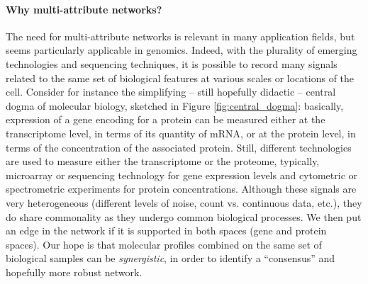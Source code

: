 \paragraph*{Why    multi-attribute    networks?}    The    need    for
multi-attribute networks  is relevant in many  application fields, but
seems particularly applicable in genomics.  Indeed, with the plurality
of emerging technologies and sequencing  techniques, it is possible to
record many signals related to the  same set of biological features at
various scales  or locations of  the cell.  Consider for  instance the
simplifying -- still hopefully didactic  -- central dogma of molecular
biology,  sketched   in  Figure   \ref{fig:central_dogma}:  basically,
expression of a gene encoding for  a protein can be measured either at
the transcriptome level,  in terms of its quantity of  mRNA, or at the
protein  level,  in  terms  of the  concentration  of  the  associated
protein.  Still, different technologies are used to measure either the
transcriptome  or the  proteome, typically,  microarray or  sequencing
technology for gene expression  levels and cytometric or spectrometric
experiments for  protein concentrations.   Although these  signals are
very  heterogeneous (different  levels of  noise, count  vs. continuous
data,  etc.),  they  do  share  commonality  as  they  undergo  common
biological processes.  We then  put an  edge in the  network if  it is
supported in both spaces (gene and  protein spaces).  Our hope is that
molecular profiles combined on the  same set of biological samples can
be  \textit{synergistic}, in  order  to identify  a ``consensus''  and
hopefully more robust network.

